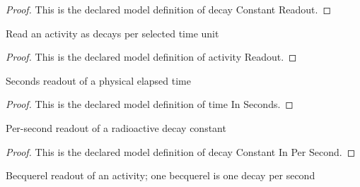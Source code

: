 \begin{proof}
  This is the declared model definition of decay Constant Readout.
\end{proof}
\begin{definition}
  \label{def:physics:phyx-mini-0576:phyxminiproblems-problemphyxmini0576-activityreadout}
  Read an activity as decays per selected time unit
\end{definition}
\begin{proof}
  This is the declared model definition of activity Readout.
\end{proof}
\begin{definition}
  \label{def:physics:phyx-mini-0576:phyxminiproblems-problemphyxmini0576-timeinseconds}
  Seconds readout of a physical elapsed time
\end{definition}
\begin{proof}
  This is the declared model definition of time In Seconds.
\end{proof}
\begin{definition}
  \label{def:physics:phyx-mini-0576:phyxminiproblems-problemphyxmini0576-decayconstantinpersecond}
  Per-second readout of a radioactive decay constant
\end{definition}
\begin{proof}
  This is the declared model definition of decay Constant In Per Second.
\end{proof}
\begin{definition}
  \label{def:physics:phyx-mini-0576:phyxminiproblems-problemphyxmini0576-activityinbecquerels}
  Becquerel readout of an activity; one becquerel is one decay per second
\end{definition}
